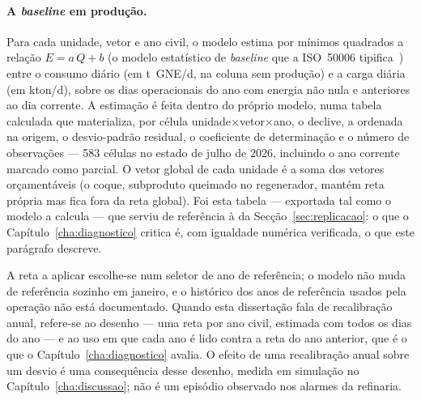 \paragraph{A \emph{baseline} em produção.} Para cada unidade, vetor e ano
civil, o modelo estima por mínimos quadrados a relação
$E = a\,Q + b$ (o modelo estatístico de \emph{baseline} que a ISO~50006
tipifica~\cite{ISO50006_2014}) entre o consumo diário (em t~GNE/d, na coluna sem
produção) e a carga diária (em kton/d), sobre os dias operacionais do ano
com energia não nula e anteriores ao dia corrente. A estimação é feita
dentro do próprio modelo, numa tabela calculada que materializa, por
célula unidade$\times$vetor$\times$ano, o declive, a ordenada na origem,
o desvio-padrão residual, o coeficiente de determinação e o número de
observações --- 583 células no estado de julho de 2026, incluindo o ano
corrente marcado como parcial. O vetor global de cada unidade é a soma
dos vetores orçamentáveis (o coque, subproduto queimado no regenerador,
mantém reta própria mas fica fora da reta global). Foi esta tabela ---
exportada tal como o modelo a calcula --- que serviu de referência à  da Secção~\ref{sec:replicacao}: o que o
Capítulo~\ref{cha:diagnostico} critica é, com igualdade numérica
verificada, o que este parágrafo descreve.

A reta a aplicar escolhe-se num seletor de ano de referência; o modelo não
muda de referência sozinho em janeiro, e o histórico dos anos de referência
usados pela operação não está documentado. Quando esta dissertação fala de
recalibração anual, refere-se ao desenho --- uma reta por ano civil, estimada
com todos os dias do ano --- e ao uso em que cada ano é lido contra a reta do
ano anterior, que é o que o Capítulo~\ref{cha:diagnostico} avalia. O efeito
de uma recalibração anual sobre um desvio é uma consequência desse desenho,
medida em simulação no Capítulo~\ref{cha:discussao}; não é um episódio
observado nos alarmes da refinaria.

